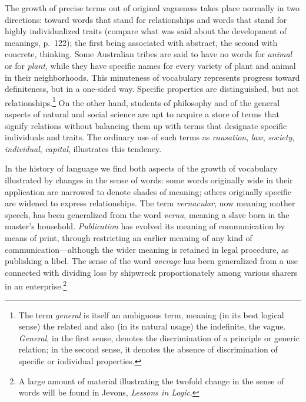 \documentclass[showtrims,ustradepaper]{memoir}
\begin{document}
The growth of precise terms out of original vagueness takes place
normally in two directions: toward words that stand for relationships
and words that stand for highly individualized traits (compare what was
said about the development of meanings, p.\ 122); the first being
associated with abstract, the second with concrete, thinking. Some
Australian tribes are said to have no words for \emph{animal} or for
\emph{plant}, while they have specific names for every variety of plant
and animal in their neighborhoods. This minuteness of vocabulary
represents
progress toward definiteness, but in a one-sided way. Specific
properties are distinguished, but not
relationships.\footnote{
The term \emph{general} is itself an ambiguous term, meaning (in its
best logical sense) the related and also (in its natural usage) the
indefinite, the vague. \emph{General}, in the first sense, denotes the
discrimination of a principle or generic relation; in the second sense,
it denotes the absence of discrimination of specific or individual
properties.
}
On the other hand, students of philosophy and of the general aspects of
natural and social science are apt to acquire a store of terms that
signify relations without balancing them up with terms that designate
specific individuals and traits. The ordinary use of such terms as
\emph{causation}, \emph{law}, \emph{society}, \emph{individual},
\emph{capital}, illustrates this tendency.


In the history of language we find both aspects of the growth of
vocabulary illustrated by changes in the sense of words: some words
originally wide in their application are narrowed to denote shades of
meaning; others originally specific are widened to express
relationships. The term \emph{vernacular}, now meaning mother speech,
has been generalized from the word \emph{verna}, meaning a slave born in
the master's household. \emph{Publication} has evolved its meaning of
communication by means of print, through restricting an earlier meaning
of any kind of communication---although the wider meaning is retained in
legal procedure, as publishing a libel. The sense of the word
\emph{average} has been generalized from a use connected with dividing
loss by shipwreck proportionately among various sharers in an
enterprise.\footnote{
A large amount of material illustrating the twofold change in the sense
of words will be found in Jevons, \emph{Lessons in Logic}.
}
\end{document}
